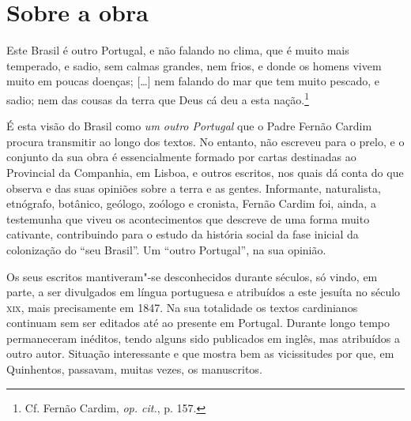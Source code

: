 \section{Sobre a obra}

\begin{hedraquote}
Este Brasil é outro Portugal, e não falando no clima,
que é muito mais temperado, e sadio, sem calmas grandes, nem frios, e
donde os homens vivem muito em poucas doenças; [\ldots{}] nem falando do mar
que tem muito pescado, e sadio; nem das cousas da terra que Deus cá deu
a esta nação.\footnote{ Cf. Fernão Cardim, \textit{op. cit.}, p. 157.}
\end{hedraquote}

É esta visão do Brasil como \textit{um outro Portugal} que o Padre
Fernão Cardim procura transmitir ao longo dos textos. No entanto, não
escreveu para o prelo, e o conjunto da sua obra é essencialmente formado
por cartas destinadas ao Provincial da Companhia, em Lisboa, e outros
escritos, nos quais dá conta do que observa e das suas opiniões sobre a
terra e as gentes. Informante, naturalista, etnógrafo, botânico,
geólogo, zoólogo e cronista, Fernão Cardim foi, ainda, a testemunha que
viveu os acontecimentos que descreve de uma forma muito cativante,
contribuindo para o estudo da história social da fase inicial da
colonização do ``seu Brasil''. Um ``outro Portugal'', na sua opinião.

Os seus escritos mantiveram"-se desconhecidos durante séculos, só
vindo, em parte, a ser divulgados em língua portuguesa e atribuídos a
este jesuíta no século \textsc{xix}, mais precisamente em 1847. Na sua
totalidade os textos cardinianos continuam sem ser editados até ao
presente em Portugal. Durante longo tempo permaneceram inéditos, tendo
alguns sido publicados em inglês, mas atribuídos a outro autor.
Situação interessante e que mostra bem as vicissitudes por que, em
Quinhentos, passavam, muitas vezes, os manuscritos.

